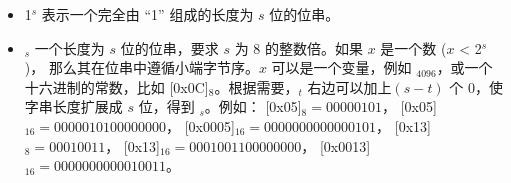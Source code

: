 \documentclass[main\_\_CN.tex]{subfiles}
\begin{document}
\begin{itemize}
\item 
1\begin{math}^s\end{math} 
\hspace{0.75cm} 
表示一个完全由 “1” 组成的长度为 \begin{math}s\end{math} 位的位串。

\item
    \begin{math}[x]_{s}\end{math}  \hspace{0.5cm}
       一个长度为 \begin{math}s\end{math} 位的位串，要求 \begin{math}s\end{math} 为 8 的整数倍。如果 \begin{math}x\end{math} 是一个数 (\begin{math}x\end{math} < 2\begin{math}^s\end{math})， 那么其在位串中遵循小端字节序。\begin{math}x\end{math} 可以是一个变量，例如 \begin{math}[Y]_{4096}\end{math}，或一个十六进制的常数，比如 [0x0C]\begin{math}_{8}\end{math}。根据需要，\begin{math}[x]_{t}\end{math} 右边可以加上\begin{math} (s-t) \end{math} 个 0，使字串长度扩展成 \begin{math}s\end{math} 位，得到 \begin{math}[x]_{s}\end{math}。例如：
       [0x05]\begin{math}_{8} = 00000101\end{math}，
       [0x05]\begin{math}_{16} = 00000101 00000000\end{math}，
       [0x0005]\begin{math}_{16} = 00000000 00000101\end{math}，
       [0x13]\begin{math}_{8} = 00010011\end{math}，
       [0x13]\begin{math}_{16} = 00010011 00000000\end{math}，
       [0x0013]\begin{math}_{16} = 00000000 00010011\end{math}。


\end{itemize}
\end{document}
